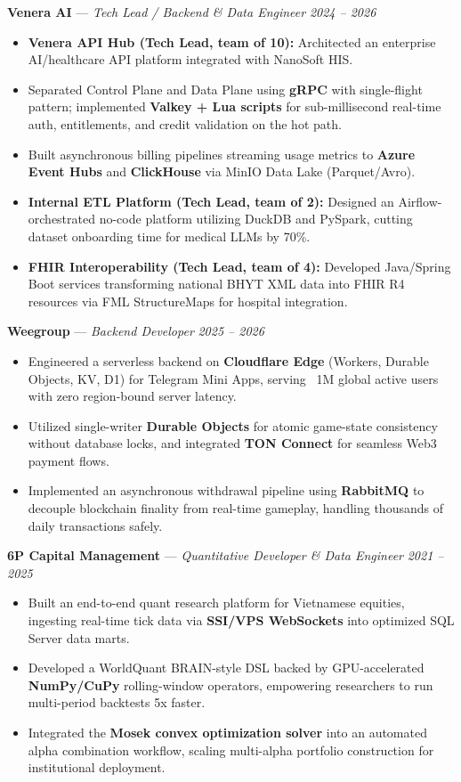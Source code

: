 \documentclass[8.5pt,a4paper]{extarticle}
\begin{document}
\noindent\textbf{Venera AI} --- \textit{Tech Lead / Backend \& Data Engineer} \hfill \textit{2024 -- 2026}
\begin{itemize}
    \item \textbf{Venera API Hub (Tech Lead, team of 10):} Architected an enterprise AI/healthcare API platform integrated with NanoSoft HIS.
    \item Separated Control Plane and Data Plane using \textbf{gRPC} with single-flight pattern; implemented \textbf{Valkey + Lua scripts} for sub-millisecond real-time auth, entitlements, and credit validation on the hot path.
    \item Built asynchronous billing pipelines streaming usage metrics to \textbf{Azure Event Hubs} and \textbf{ClickHouse} via MinIO Data Lake (Parquet/Avro).
    \item \textbf{Internal ETL Platform (Tech Lead, team of 2):} Designed an Airflow-orchestrated no-code platform utilizing DuckDB and PySpark, cutting dataset onboarding time for medical LLMs by 70\%.
    \item \textbf{FHIR Interoperability (Tech Lead, team of 4):} Developed Java/Spring Boot services transforming national BHYT XML data into FHIR R4 resources via FML StructureMaps for hospital integration.
\end{itemize}

\vspace{2pt}
\noindent\textbf{Weegroup} --- \textit{Backend Developer} \hfill \textit{2025 -- 2026}
\begin{itemize}
    \item Engineered a serverless backend on \textbf{Cloudflare Edge} (Workers, Durable Objects, KV, D1) for Telegram Mini Apps, serving ~1M global active users with zero region-bound server latency.
    \item Utilized single-writer \textbf{Durable Objects} for atomic game-state consistency without database locks, and integrated \textbf{TON Connect} for seamless Web3 payment flows.
    \item Implemented an asynchronous withdrawal pipeline using \textbf{RabbitMQ} to decouple blockchain finality from real-time gameplay, handling thousands of daily transactions safely.
\end{itemize}

\vspace{2pt}
\noindent\textbf{6P Capital Management} --- \textit{Quantitative Developer \& Data Engineer} \hfill \textit{2021 -- 2025}
\begin{itemize}
    \item Built an end-to-end quant research platform for Vietnamese equities, ingesting real-time tick data via \textbf{SSI/VPS WebSockets} into optimized SQL Server data marts.
    \item Developed a WorldQuant BRAIN-style DSL backed by GPU-accelerated \textbf{NumPy/CuPy} rolling-window operators, empowering researchers to run multi-period backtests 5x faster.
    \item Integrated the \textbf{Mosek convex optimization solver} into an automated alpha combination workflow, scaling multi-alpha portfolio construction for institutional deployment.
\end{itemize}
\end{document}
